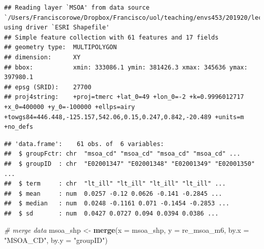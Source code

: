 \documentclass[]{book}
\newenvironment{Shaded}{\begin{snugshade}}{\end{snugshade}}
\newcommand{\KeywordTok}[1]{\textcolor[rgb]{0.13,0.29,0.53}{\textbf{#1}}}
\newcommand{\DataTypeTok}[1]{\textcolor[rgb]{0.13,0.29,0.53}{#1}}
\newcommand{\StringTok}[1]{\textcolor[rgb]{0.31,0.60,0.02}{#1}}
\newcommand{\CommentTok}[1]{\textcolor[rgb]{0.56,0.35,0.01}{\textit{#1}}}
\newcommand{\OperatorTok}[1]{\textcolor[rgb]{0.81,0.36,0.00}{\textbf{#1}}}
\newcommand{\NormalTok}[1]{#1}
\begin{document}
\begin{verbatim}
## Reading layer `MSOA' from data source `/Users/Franciscorowe/Dropbox/Francisco/uol/teaching/envs453/201920/lectures/san/data/mlm/MSOA.shp' using driver `ESRI Shapefile'
## Simple feature collection with 61 features and 17 fields
## geometry type:  MULTIPOLYGON
## dimension:      XY
## bbox:           xmin: 333086.1 ymin: 381426.3 xmax: 345636 ymax: 397980.1
## epsg (SRID):    27700
## proj4string:    +proj=tmerc +lat_0=49 +lon_0=-2 +k=0.9996012717 +x_0=400000 +y_0=-100000 +ellps=airy +towgs84=446.448,-125.157,542.06,0.15,0.247,0.842,-20.489 +units=m +no_defs
\end{verbatim}

\begin{Shaded}
\end{Shaded}

\begin{verbatim}
## 'data.frame':    61 obs. of  6 variables:
##  $ groupFctr: chr  "msoa_cd" "msoa_cd" "msoa_cd" "msoa_cd" ...
##  $ groupID  : chr  "E02001347" "E02001348" "E02001349" "E02001350" ...
##  $ term     : chr  "lt_ill" "lt_ill" "lt_ill" "lt_ill" ...
##  $ mean     : num  0.0257 -0.12 0.0626 -0.141 -0.2845 ...
##  $ median   : num  0.0248 -0.1161 0.071 -0.1454 -0.2853 ...
##  $ sd       : num  0.0427 0.0727 0.094 0.0394 0.0386 ...
\end{verbatim}

\begin{Shaded}
\begin{Highlighting}[]
\CommentTok{# merge data}
\NormalTok{msoa_shp <-}\StringTok{ }\KeywordTok{merge}\NormalTok{(}\DataTypeTok{x =}\NormalTok{ msoa_shp, }\DataTypeTok{y =}\NormalTok{ re_msoa_m6, }\DataTypeTok{by.x =} \StringTok{"MSOA_CD"}\NormalTok{, }\DataTypeTok{by.y =} \StringTok{"groupID"}\NormalTok{)}
\end{Highlighting}
\end{Shaded}
\end{document}

